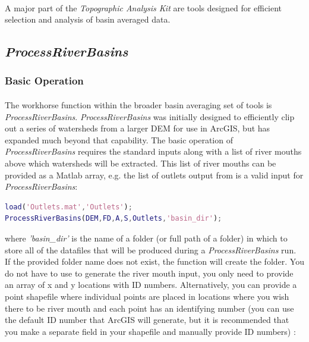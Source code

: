 \paragraph{}A major part of the \textit{Topographic Analysis Kit} are tools designed for efficient selection and analysis of basin averaged data.

\subsection{\textit{ProcessRiverBasins}} \label{sec:PrcRvBsn}

\subsubsection{Basic Operation}
\paragraph{}The workhorse function within the broader basin averaging set of tools is \textit{ProcessRiverBasins}. \textit{ProcessRiverBasins} was initially designed to efficiently clip out a series of watersheds from a larger DEM for use in ArcGIS, but has expanded much beyond that capability. The basic operation of \textit{ProcessRiverBasins} requires the standard inputs along with a list of river mouths above which watersheds will be extracted. This list of river mouths can be provided as a Matlab array, e.g. the list of outlets output from  is a valid input for \textit{ProcessRiverBasins}:

\begin{lstlisting}[language=Matlab]
% Using output of BasinPicker to run ProcessRiverBasins
load('Outlets.mat','Outlets');
ProcessRiverBasins(DEM,FD,A,S,Outlets,'basin_dir');
\end{lstlisting}

\noindent
where \textit{'basin\_dir'} is the name of a folder (or full path of a folder) in which to store all of the datafiles that will be produced during a \textit{ProcessRiverBasins} run. If the provided folder name does not exist, the function will create the folder. You do not have to use  to generate the river mouth input, you only need to provide an array of x and y locations with ID numbers. Alternatively, you can provide a point shapefile where individual points are placed in locations where you wish there to be river mouth and each point has an identifying number (you can use the default ID number that ArcGIS will generate, but it is recommended that you make a separate field in your shapefile and manually provide ID numbers) :

